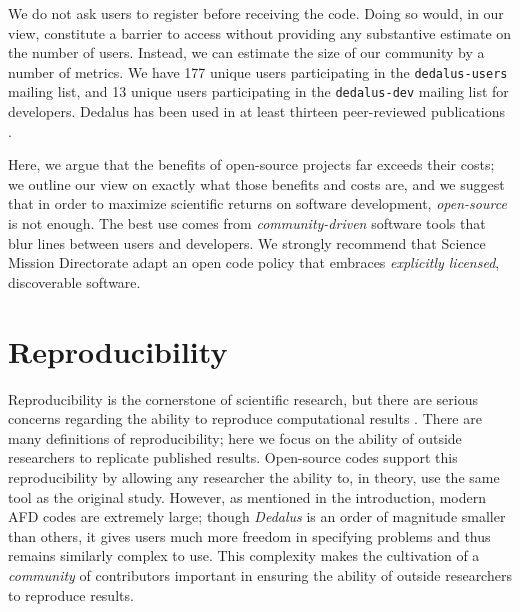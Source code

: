 \documentclass[12pt, titlepage]{aastex62}
\begin{document}
We do not ask users to register before receiving the code. Doing so would, in our view, constitute a barrier to access without providing any substantive estimate on the number of users. Instead, we can estimate the size of our community by a number of metrics. We have 177 unique users participating in the \texttt{dedalus-users} mailing list, and 13 unique users participating in the \texttt{dedalus-dev} mailing list for developers. Dedalus has been used in at least thirteen peer-reviewed publications \citep{2018Bordwell,2017PhRvF...2h3501A,PhysRevFluids.2.094804,2017ApJ...841....1C,2017ApJ...841....2C,2017MNRAS.466.2181L,2016ApJ...832...71L,2016JCoPh.325...53V,2016PhRvE..94e3206D,2016PhRvL.116j5004D,2016MNRAS.455.4274L,2015PhRvE..91f3016L,2014ApJ...797...94L}.

Here, we argue that the benefits of open-source projects far exceeds their costs; we outline our view on exactly what those benefits and costs are, and we suggest that in order to maximize scientific returns on software development, \emph{open-source} is not enough. The best use comes from \emph{community-driven} software tools that blur lines between users and developers. We strongly recommend that Science Mission Directorate adapt an open code policy that embraces \emph{explicitly licensed}, discoverable software. 

\section{Reproducibility}
\label{sec:repro}

Reproducibility is the cornerstone of scientific research, but there are serious concerns regarding the ability to reproduce computational results \citep[see][and references therein]{2012ICERM_REPORT}. There are many definitions of reproducibility; here we focus on the ability of outside researchers to replicate published results. Open-source codes support this reproducibility by allowing any researcher the ability to, in theory, use the same tool as the original study. However, as mentioned in the introduction, modern AFD codes are extremely large; though \emph{Dedalus} is an order of magnitude smaller than others, it gives users much more freedom in specifying problems and thus remains similarly complex to use. This complexity makes the cultivation of a \emph{community} of contributors important in ensuring the ability of outside researchers to reproduce results. 
\end{document}
